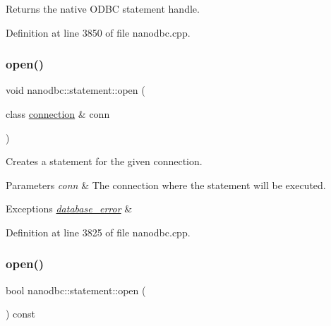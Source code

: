 Returns the native O\+D\+BC statement handle. 



Definition at line 3850 of file nanodbc.\+cpp.

\mbox{\label{classnanodbc_1_1statement_a473ec2d726f6d8acc42ce0f5f6d1b967}} 
\subsubsection{\texorpdfstring{open()}{open()}\hspace{0.1cm}{\footnotesize\ttfamily [1/2]}}
{\footnotesize\ttfamily void nanodbc\+::statement\+::open (\begin{DoxyParamCaption}\item[{class \mbox{\hyperlink{classnanodbc_1_1connection}{connection}} \&}]{conn }\end{DoxyParamCaption})}



Creates a statement for the given connection. 


\begin{DoxyParams}{Parameters}
{\em conn} & The connection where the statement will be executed. \\
\hline
\end{DoxyParams}

\begin{DoxyExceptions}{Exceptions}
{\em \mbox{\hyperlink{classnanodbc_1_1database__error}{database\+\_\+error}}} & \\
\hline
\end{DoxyExceptions}


Definition at line 3825 of file nanodbc.\+cpp.

\mbox{\label{classnanodbc_1_1statement_a7e34012ad0120d8c3780bea1d29c3903}} 
\subsubsection{\texorpdfstring{open()}{open()}\hspace{0.1cm}{\footnotesize\ttfamily [2/2]}}
{\footnotesize\ttfamily bool nanodbc\+::statement\+::open (\begin{DoxyParamCaption}{ }\end{DoxyParamCaption}) const}




